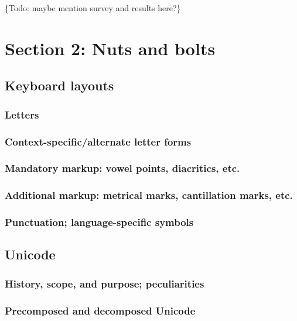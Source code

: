 \documentclass[11pt]{article}
\begin{document}
\{Todo: maybe mention survey and results here?\}

\section{Section 2: Nuts and bolts}
\label{sec:orga6bc64f}

\subsection{Keyboard layouts}
\label{sec:org68b4319}

\subsubsection{Letters}
\label{sec:orge99e1a0}

\subsubsection{Context-specific/alternate letter forms}
\label{sec:orgcd06a24}

\subsubsection{Mandatory markup: vowel points, diacritics, etc.}
\label{sec:orgc4bfab0}

\subsubsection{Additional markup: metrical marks, cantillation marks, etc.}
\label{sec:org5daf3c8}

\subsubsection{Punctuation; language-specific symbols}
\label{sec:org73b0c07}

\subsection{Unicode}
\label{sec:orgc7996bf}

\subsubsection{History, scope, and purpose; peculiarities}
\label{sec:orgca31bba}

\subsubsection{Precomposed and decomposed Unicode}
\label{sec:orgbf9afdc}
\end{document}
